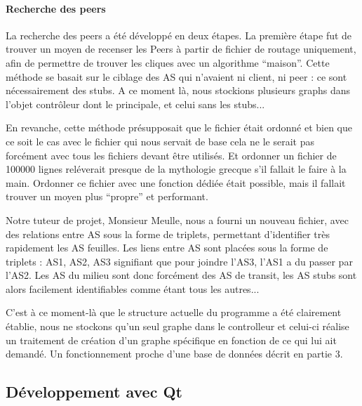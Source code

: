 \paragraph{Recherche des peers\\}
\par La recherche des peers a été développé en deux étapes. La première étape fut de trouver un moyen de recenser les Peers à partir de fichier de routage uniquement, afin de permettre de trouver les cliques avec un algorithme ``maison''. Cette méthode se basait sur le ciblage des AS qui n'avaient ni client, ni peer : ce sont n\'ecessairement des stubs. A ce moment là, nous stockions plusieurs graphs dans l'objet contrôleur dont le principale, et celui sans les stubs... 

En revanche, cette méthode présupposait que le fichier était ordonné et bien que ce soit le cas avec le fichier qui nous servait de base cela ne le serait pas forcément avec tous les fichiers devant être utilisés. Et ordonner un fichier de 100000 lignes reléverait presque de la mythologie grecque s'il fallait le faire à la main. Ordonner ce fichier avec une fonction dédiée était possible, mais il fallait trouver un moyen plus ``propre'' et performant.

\par Notre tuteur de projet, Monsieur Meulle, nous a fourni un nouveau fichier, avec des relations entre AS sous la forme de triplets, permettant d'identifier tr\`es rapidement les AS feuilles.
Les liens entre AS sont plac\'ees sous la forme de triplets : {AS1, AS2, AS3} signifiant que pour joindre l'AS3, l'AS1 a du passer par l'AS2. Les AS du milieu sont donc forcément des AS de transit, les AS stubs sont alors facilement identifiables comme \'etant tous les autres... 

C'est à ce moment-là que le structure actuelle du programme a été clairement établie, nous ne stockons qu'un seul graphe dans le controlleur et celui-ci réalise un traitement de création d'un graphe spécifique en fonction de ce qui lui ait demandé. Un fonctionnement proche d'une base de données décrit en partie 3.

\subsection{D\'eveloppement avec Qt}




